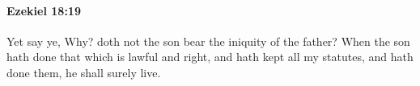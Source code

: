 
		\paragraph{Ezekiel 18:19} %
			\label{EZEKIEL-18-19}

			Yet say ye, Why? doth not the son bear the iniquity of the father? When the son hath done that which is lawful and right, and hath kept all my statutes, and hath done them, he shall surely live.


